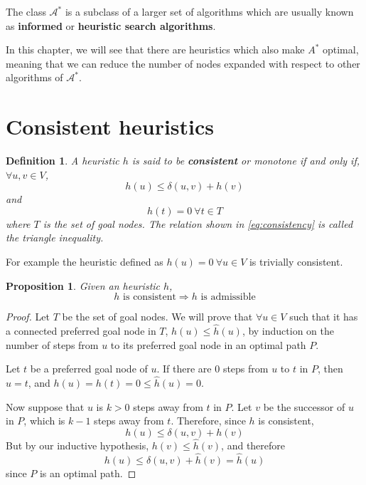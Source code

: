 \documentclass[12pt]{report}
\newtheorem{definition}[theorem]{Definition}
\newtheorem{proposition}[theorem]{Proposition}
\begin{document}
The class $\mathcal{A^*}$ is a subclass of a larger set of algorithms which are usually known as \textbf{informed} or \textbf{heuristic search algorithms}.

In this chapter, we will see that there are heuristics which also make $A^*$ optimal, meaning that we can reduce the number of nodes expanded with respect to other algorithms of $\mathcal{A^*}$.

\section{Consistent heuristics}

\begin{definition}
A heuristic $h$ is said to be \textbf{consistent} or monotone if and only if, $\forall u, v \in V$,
\begin{equation}
	h(u) \leq \delta(u, v) + h(v)\label{eq:consistency}
\end{equation}
and
\begin{equation}
	h(t) = 0 \  \forall t \in T
\end{equation}
where $T$ is the set of goal nodes.
The relation shown in \ref{eq:consistency} is called the triangle inequality.
\end{definition}

For example the heuristic defined as $h(u) = 0 \  \forall u \in V$ is trivially consistent.

\begin{proposition}
\label{prop:consistent}
Given an heuristic $h$,
\[ h \text{ is consistent} \Rightarrow h \text{ is admissible} \]
\end{proposition}
\begin{proof}
Let $T$ be the set of goal nodes. We will prove that $\forall u \in V$ such that it has a connected preferred goal node in $T$, $h(u) \leq \hat{h}(u)$, by induction on the number of steps from $u$ to its preferred goal node in an optimal path $P$.

Let $t$ be a preferred goal node of $u$. If there are 0 steps from $u$ to $t$ in $P$, then $u = t$, and $h(u) = h(t) = 0 \leq \hat{h}(u) = 0$.

Now suppose that $u$ is $k > 0$ steps away from $t$ in $P$. Let $v$ be the successor of $u$ in $P$, which is $k-1$ steps away from $t$. Therefore, since $h$ is consistent,
\[ h(u) \leq \delta(u, v) + h(v) \]
But by our inductive hypothesis, $h(v) \leq \hat{h}(v)$, and therefore
\[ h(u) \leq \delta(u, v) + \hat{h}(v) = \hat{h}(u) \]
since $P$ is an optimal path.
\end{proof}
\end{document}
